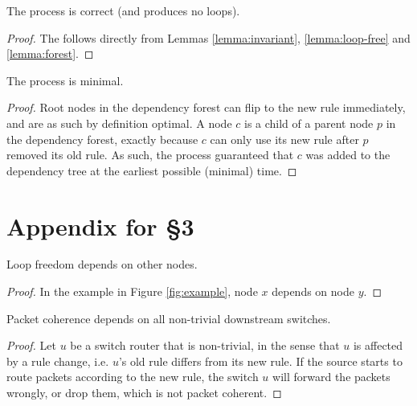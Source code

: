
\begin{lemma}\label{lemma:correctness} The process is correct (and produces no loops).
\end{lemma}

\begin{proof} The follows directly from Lemmas \ref{lemma:invariant}, \ref{lemma:loop-free} and \ref{lemma:forest}.
\end{proof}

\begin{lemma}\label{lemma:minimal} The process is minimal.
\end{lemma}

\begin{proof}
Root nodes in the dependency forest can flip to the new rule immediately, and are as such by definition optimal. A node $c$ is a child of a parent node $p$ in the dependency forest, exactly because $c$ can only use its new rule after $p$ removed its old rule. As such, the process guaranteed that $c$ was added to the dependency tree at the earliest possible (minimal) time.
\end{proof}

\section{Appendix for \S3}
\label{sec:app2}


\begin{lemma}\label{lemma:imp loop-free} Loop freedom depends on other nodes.
\end{lemma}

\begin{proof}
In the example in Figure \ref{fig:example}, node $x$ depends on node $y$.
\end{proof}

\begin{lemma}\label{lemma:imp packet coherence} Packet coherence depends on all non-trivial downstream switches.
\end{lemma}

\begin{proof} Let $u$ be a switch router that is non-trivial, in the sense that $u$ is affected by a rule change, i.e. $u$'s old rule differs from its new rule. If the source starts to route packets according to the new rule, the switch $u$ will forward the packets wrongly, or drop them, which is not packet coherent.
\end{proof}


